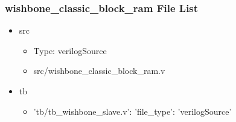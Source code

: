 \subsubsection{wishbone\_classic\_block\_ram File List}
\begin{itemize}
\item src
	\begin{itemize}
	\item[$\space$] Type: verilogSource
	\item src/wishbone\_classic\_block\_ram.v
	\end{itemize}
\item tb
	\begin{itemize}
	\item {'tb/tb\_wishbone\_slave.v': {'file\_type': 'verilogSource'}}
	\end{itemize}
\end{itemize}
